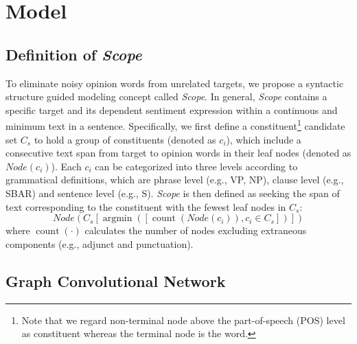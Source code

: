 \documentclass{article}
\begin{document}
\section{Model}
\subsection{Definition of \emph{Scope}}
To eliminate noisy opinion words from unrelated targets, we propose a syntactic structure guided modeling concept called \emph{Scope}. In general, \emph{Scope} contains a specific target and its dependent sentiment expression within a continuous and minimum text in a sentence. Specifically, we first define a constituent\footnote{Note that we regard non-terminal node above the part-of-speech (POS) level as constituent whereas the terminal node is the word.} candidate set $C_s$ to hold a group of constituents (denoted as $c_i$), which include a consecutive text span from target to opinion words in their leaf nodes (denoted as $Node(c_i)$).  Each $c_i$ can be categorized into three levels according to grammatical definitions, which are phrase level (e.g., VP, NP), clause level (e.g., SBAR) and sentence level (e.g., S). \emph{Scope} is then defined as seeking the span of text corresponding to the constituent with the fewest leaf nodes in $C_s$:
\begin{equation}
Node(C_s\left[\operatorname{argmin}(\left[\operatorname{count}(Node(c_i)), c_i \in C_s\right])\right]) \label{eq0}
\end{equation}
where $\operatorname{count}(\cdot)$ calculates the number of nodes excluding extraneous components (e.g., adjunct and punctuation). 


\subsection{Graph Convolutional Network}
\end{document}
